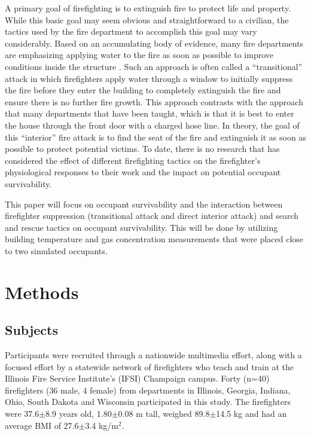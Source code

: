 \documentclass[12pt,oneside]{article}
\begin{document}
A primary goal of firefighting is to extinguish fire to protect life and property. While this basic goal may seem obvious and straightforward to a civilian, the tactics used by the fire department to accomplish this goal may vary considerably. Based on an accumulating body of evidence, many fire departments are emphasizing applying water to the fire as soon as possible to improve conditions inside the structure \cite{DHS2010}. Such an approach is often called a ``transitional'' attack in which firefighters apply water through a window to initially suppress the fire before they enter the building to completely extinguish the fire and ensure there is no further fire growth.  This approach contrasts with the approach that many departments that have been taught, which is that it is best to enter the house through the front door with a charged hose line. In theory, the goal of this ``interior'' fire attack is to find the seat of the fire and extinguish it as soon as possible to protect potential victims. To date, there is no research that has considered the effect of different firefighting tactics on the firefighter's physiological responses to their work and the impact on potential occupant survivability.

This paper will focus on occupant survivability and the interaction between firefighter suppression (transitional attack and direct interior attack) and search and rescue tactics on occupant survivability.  This will be done by utilizing building temperature and gas concentration measurements that were placed close to two simulated occupants.  

\section{Methods}
\label{sec:methods}

\subsection{Subjects}
\label{subsec:subjects}
Participants were recruited through a nationwide multimedia effort, along with a focused effort by a statewide network of firefighters who teach and train at the Illinois Fire Service Institute's (IFSI) Champaign campus. Forty (n=40) firefighters (36 male, 4 female) from departments in Illinois, Georgia, Indiana, Ohio, South Dakota and Wisconsin participated in this study. The firefighters were 37.6$\pm$8.9 years old, 1.80$\pm$0.08 m tall, weighed 89.8$\pm$14.5 kg and had an average BMI of 27.6$\pm$3.4 kg/m$^2$.
\end{document}
